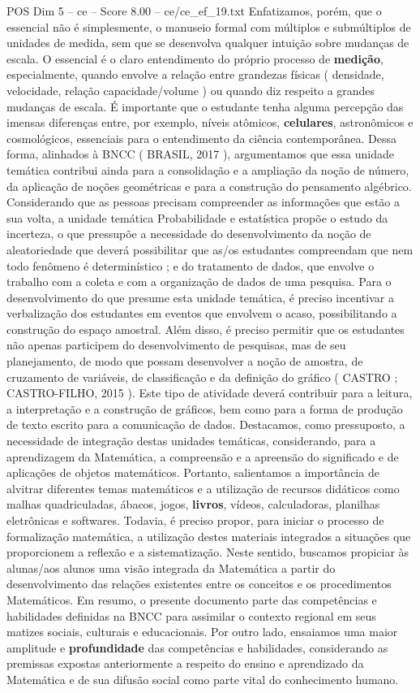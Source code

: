 \begin{textsample}{POS Dim 5 – ce – Score 8.00 – ce/ce\_ef\_19.txt}
Enfatizamos, porém, que o essencial não é simplesmente, o manuseio formal com múltiplos e submúltiplos de unidades de medida, sem que se desenvolva qualquer intuição sobre mudanças de escala.
O essencial é o claro entendimento do próprio processo de \textbf{medição}, especialmente, quando envolve a relação entre grandezas físicas ( densidade, velocidade, relação capacidade/volume ) ou quando diz respeito a grandes mudanças de escala.
É importante que o estudante tenha alguma percepção das imensas diferenças entre, por exemplo, níveis atômicos, \textbf{celulares}, astronômicos e cosmológicos, essenciais para o entendimento da ciência contemporânea.
Dessa forma, alinhados à BNCC ( BRASIL, 2017 ), argumentamos que essa unidade temática contribui ainda para a consolidação e a ampliação da noção de número, da aplicação de noções geométricas e para a construção do pensamento algébrico.
Considerando que as pessoas precisam compreender as informações que estão a sua volta, a unidade temática Probabilidade e estatística propõe o estudo da incerteza, o que pressupõe a necessidade do desenvolvimento da noção de aleatoriedade que deverá possibilitar que as/os estudantes compreendam que nem todo fenômeno é determinístico ; e do tratamento de dados, que envolve o trabalho com a coleta e com a organização de dados de uma pesquisa.
Para o desenvolvimento do que presume esta unidade temática, é preciso incentivar a verbalização dos estudantes em eventos que envolvem o acaso, possibilitando a construção do espaço amostral.
Além disso, é preciso permitir que os estudantes não apenas participem do desenvolvimento de pesquisas, mas de seu planejamento, de modo que possam desenvolver a noção de amostra, de cruzamento de variáveis, de classificação e da definição do gráfico ( CASTRO ; CASTRO-FILHO, 2015 ).
Este tipo de atividade deverá contribuir para a leitura, a interpretação e a construção de gráficos, bem como para a forma de produção de texto escrito para a comunicação de dados.
Destacamos, como pressuposto, a necessidade de integração destas unidades temáticas, considerando, para a aprendizagem da Matemática, a compreensão e a apreensão do significado e de aplicações de objetos matemáticos.
Portanto, salientamos a importância de alvitrar diferentes temas matemáticos e a utilização de recursos didáticos como malhas quadriculadas, ábacos, jogos, \textbf{livros}, vídeos, calculadoras, planilhas eletrônicas e softwares.
Todavia, é preciso propor, para iniciar o processo de formalização matemática, a utilização destes materiais integrados a situações que proporcionem a reflexão e a sistematização.
Neste sentido, buscamos propiciar às alunas/aos alunos uma visão integrada da Matemática a partir do desenvolvimento das relações existentes entre os conceitos e os procedimentos Matemáticos.
Em resumo, o presente documento parte das competências e habilidades definidas na BNCC para assimilar o contexto regional em seus matizes sociais, culturais e educacionais.
Por outro lado, ensaiamos uma maior amplitude e \textbf{profundidade} das competências e habilidades, considerando as premissas expostas anteriormente a respeito do ensino e aprendizado da Matemática e de sua difusão social como parte vital do conhecimento humano.


\end{textsample}
